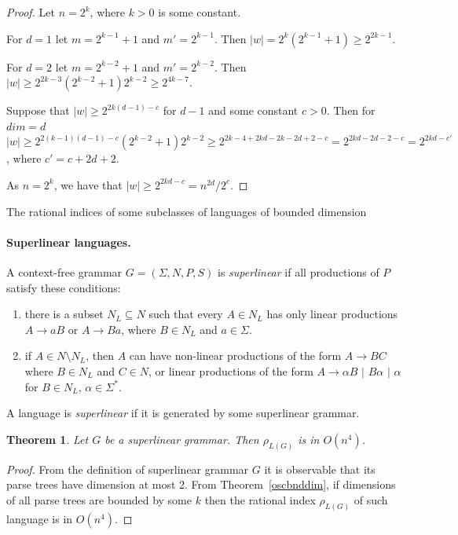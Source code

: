 \documentclass[11pt,a4paper]{article} %
\newtheorem{theorem}{Theorem}
\begin{document}
\begin{proof}
Let $n = 2^k$, where $k > 0$ is some constant.

For $d=1$ let $m = 2^{k-1} + 1$ and $m'= 2^{k-1}$.  Then $|w| = 2^k(2^{k-1} + 1) \ge 2^{2k-1}$.

For $d=2$ let $m = 2^{k-2} + 1$ and $m'= 2^{k-2}$.  Then $|w| \ge 2^{2k-3} (2^{k-2} + 1)2^{k-2} \ge 2^{4k - 7}$.

Suppose that $|w| \ge 2^{2k(d-1)-c}$ for $d-1$ and some constant $c > 0$. Then for $dim = d$ $|w| \ge 2^{2(k-1)(d-1)-c}(2^{k-2}+1)2^{k-2} \ge 2^{2k-4+2kd-2k-2d+2-c} = 2^{2kd-2d-2-c} = 2^{2kd - c'}$, where $c' = c + 2d + 2$.

As $n = 2^k$, we have that  $|w| \ge 2^{2kd-c} = n^{2d}/2^c$.
\end{proof}



\begin{subsection}{The rational indices of some subclasses of languages of bounded dimension}  



\paragraph{Superlinear languages.} 
A context-free grammar $G = (\Sigma, N, P, S)$ is \textit{superlinear} \cite{superlinear} if all productions of $P$ satisfy these conditions:
\begin{enumerate}
\item there is a subset $N_L \subseteq N$ such that every $A \in N_L$ has only linear productions $A\rightarrow aB$ or $A\rightarrow Ba$, where $B \in N_L$ and $a \in \Sigma$.
\item if $A \in N \setminus N_L$, then $A$ can have non-linear productions of the form $A \rightarrow BC$ where $B\in N_L$ and $C \in N$, or linear productions of the form $A\rightarrow \alpha B$ $\vert$ $B \alpha$ $\vert$ $\alpha$ for $B \in N_L$, $\alpha \in \Sigma^*$.
\end{enumerate}
A language is \textit{superlinear} if it is generated by some superlinear grammar. 
\begin{theorem} Let $G$ be a superlinear grammar. Then $\rho_{L(G)}$ is in $O(n^4)$.
\end{theorem}
\begin{proof}
From the definition of superlinear grammar $G$ it is observable that its parse trees have dimension at most 2. From 
Theorem~\ref{oscbnddim}, if dimensions of all parse trees are bounded by some $k$ then the rational index $\rho_{L(G)}$ of such language is in $O(n^4)$.
\end{proof}



\end{subsection}
\end{document}

